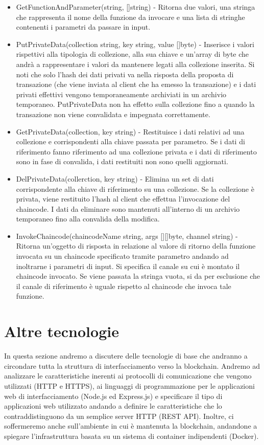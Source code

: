 \begin{itemize}
    \item GetFunctionAndParameter(string, []string) - Ritorna due valori, una stringa che rappresenta il nome della funzione da invocare e una lista di stringhe contenenti i parametri da passare in input. 
    \item PutPrivateData(collection string, key string, value []byte) - Inserisce i valori rispettivi alla tipologia di collezione, alla sua chiave e un'array di byte che andrà a rappresentare i valori da mantenere legati alla collezione inserita. Si noti che solo l'hash dei dati privati va nella risposta della proposta di transazione (che viene inviata al client che ha emesso la transazione) e i dati privati effettivi vengono temporaneamente archiviati in un archivio temporaneo. PutPrivateData non ha effetto sulla collezione fino a quando la transazione non viene convalidata e impegnata correttamente.
    \item GetPrivateData(collection, key string) - Restituisce i dati relativi ad una collezione e corrispondenti alla chiave passata per parametro. Se i dati di riferimento fanno riferimento ad una collezione privata e i dati di riferimento sono in fase di convalida, i dati restituiti non sono quelli aggiornati. 
    \item DelPrivateData(collerction, key string) - Elimina un set di dati corrispondente alla chiave di riferimento su una collezione. Se la collezione è privata, viene restituito l'hash al client che effettua l'invocazione del chaincode. I dati da eliminare sono mantenuti all'interno di un archivio temporaneo fino alla convalida della modifica. 
    \item InvokeChaincode(chaincodeName string, args [][]byte, channel string) - Ritorna un'oggetto di risposta in relazione al valore di ritorno della funzione invocata su un chaincode specificato tramite parametro andando ad inoltrarne i parametri di input. Si specifica il canale su cui è montato il chaincode invocato. Se viene passata la stringa vuota, si da per esclusione che il canale di riferimento è uguale rispetto al chaincode che invoca tale funzione.
\end{itemize}
\newpage
\section{Altre tecnologie}
In questa sezione andremo a discutere delle tecnologie di base che andranno a circondare tutta la struttura di interfacciamento verso la blockchain. Andremo ad analizzare le caratteristiche inerenti ai protocolli di comunicazione che vengono utilizzati (HTTP e HTTPS), ai linguaggi di programmazione per le applicazioni web di interfacciamento (Node.js ed Express.js) e specificare il tipo di applicazioni web utilizzato andando a definire le caratteristiche che lo contraddistinguono da un semplice server HTTP (REST API). Inoltre, ci soffermeremo anche sull'ambiente in cui è mantenuta la blockchain, andandone a spiegare l'infrastruttura basata su un sistema di container indipendenti (Docker). 
